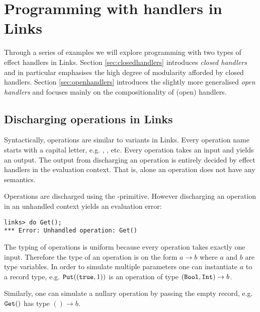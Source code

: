 \chapter{Programming with handlers in Links}\label{ch:programming}
Through a series of examples we will explore programming with two types of effect handlers in Links. Section \ref{sec:closedhandlers} introduces \emph{closed handlers} and in particular emphasises the high degree of modularity afforded by closed handlers. Section \ref{sec:openhandlers} introduces the slightly more generalised \emph{open handlers} and focuses mainly on the compositionality of (open) handlers.

\section{Discharging operations in Links}\label{sec:discharge}
Syntactically, operations are similar to variants in Links. Every operation name starts with a capital letter, e.g. , , etc. Every operation takes an input and yields an output. The output from discharging an operation is entirely decided by effect handlers in the evaluation context. That is, alone an operation does not have any semantics.

Operations are discharged using the -primitive. However discharging an operation in an unhandled context yields an evaluation error:
\begin{lstlisting}[style=links]
links> do Get();
*** Error: Unhandled operation: Get()
\end{lstlisting}
The typing of operations is uniform because every operation takes exactly one input. Therefore the type of an operation is on the form $a \to b$ where $a$ and $b$ are type variables. In order to simulate multiple parameters one can instantiate $a$ to a record type, e.g. $\texttt{Put}((\texttt{true},1))$ is an operation of type $(\texttt{Bool},\texttt{Int}) \to b$.

Similarly, one can simulate a nullary operation by passing the empty record, e.g. $\texttt{Get}()$ has type $() \to b$.
